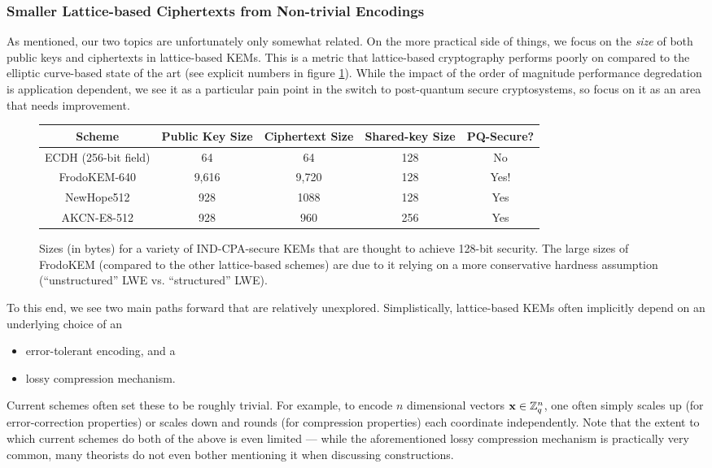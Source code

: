 \subsubsection{Smaller Lattice-based Ciphertexts from Non-trivial Encodings}

As mentioned, our two topics are unfortunately only somewhat related.
On the more practical side of things, we focus on the \emph{size} of both public keys and ciphertexts in lattice-based KEMs.
This is a metric that lattice-based cryptography performs poorly on compared to the elliptic curve-based state of the art (see explicit numbers in figure \ref{tab: sizes}).
While the impact of the order of magnitude performance degredation is application dependent, we see it as a particular pain point in the switch to post-quantum secure cryptosystems, so focus on it as an area that needs improvement.

\begin{figure}
	\begin{center}
		\begin{tabular}{|c|c|c|c|c|}\hline
			Scheme & Public Key Size & Ciphertext Size & Shared-key Size& PQ-Secure? \\\hline
			ECDH (256-bit field) & 64& 64&128& No\\
			FrodoKEM-640 \cite{CCS:BCDMNN16} & 9,616& 9,720&128& Yes!\\
			NewHope512 \cite{USENIX:ADPS16} & 928 &1088&128& Yes\\
			AKCN-E8-512 \cite{E8}&928&960&256& Yes
			\\\hline
		\end{tabular}
		\caption{Sizes (in bytes) for a variety of IND-CPA-secure KEMs that are thought to achieve 128-bit security.
			The large sizes of FrodoKEM (compared to the other lattice-based schemes) are due to it relying on a more conservative hardness assumption (``unstructured'' LWE vs. ``structured'' LWE).}\label{tab: sizes}
	\end{center}	
\end{figure}


To this end, we see two main paths forward that are relatively unexplored.
Simplistically, lattice-based KEMs often implicitly depend on an underlying choice of an
\begin{itemize}
	\item error-tolerant encoding, and a
	\item lossy compression mechanism.
\end{itemize}
Current schemes often set these to be roughly trivial.
For example, to encode $n$ dimensional vectors $\mathbf{x}\in\mathbb{Z}_q^n$, one often simply scales up (for error-correction properties) or scales down and rounds (for compression properties) each coordinate independently.
Note that the extent to which current schemes do both of the above is even limited --- while the aforementioned lossy compression mechanism is practically very common, many theorists do not even bother mentioning it when discussing constructions.

